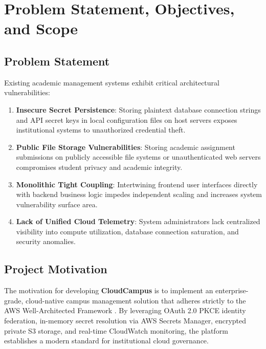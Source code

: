\newpage
\section{Problem Statement, Objectives, and Scope}

\subsection{Problem Statement}
Existing academic management systems exhibit critical architectural vulnerabilities:
\begin{enumerate}[leftmargin=*,itemsep=2pt]
    \item \textbf{Insecure Secret Persistence}: Storing plaintext database connection strings and API secret keys in local configuration files on host servers exposes institutional systems to unauthorized credential theft.
    \item \textbf{Public File Storage Vulnerabilities}: Storing academic assignment submissions on publicly accessible file systems or unauthenticated web servers compromises student privacy and academic integrity.
    \item \textbf{Monolithic Tight Coupling}: Intertwining frontend user interfaces directly with backend business logic impedes independent scaling and increases system vulnerability surface area.
    \item \textbf{Lack of Unified Cloud Telemetry}: System administrators lack centralized visibility into compute utilization, database connection saturation, and security anomalies.
\end{enumerate}

\subsection{Project Motivation}
The motivation for developing \textbf{CloudCampus} is to implement an enterprise-grade, cloud-native campus management solution that adheres strictly to the AWS Well-Architected Framework \cite{aws_s3, aws_ec2}. By leveraging OAuth 2.0 PKCE identity federation, in-memory secret resolution via AWS Secrets Manager, encrypted private S3 storage, and real-time CloudWatch monitoring, the platform establishes a modern standard for institutional cloud governance.

